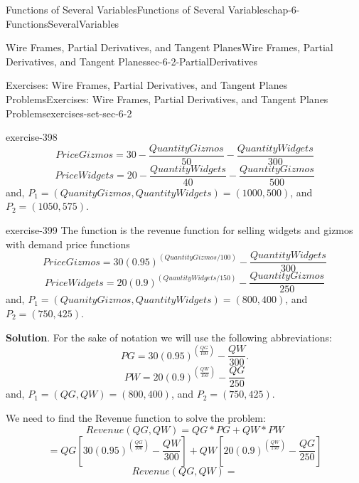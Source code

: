 \documentclass[oneside,10pt,]{book}
\numberwithin{equation}{section}
\begin{document}
\begin{chapterptx}{Functions of Several Variables}{}{Functions of Several Variables}{}{}{chap-6-FunctionsSeveralVariables}
\begin{sectionptx}{Wire Frames, Partial Derivatives, and Tangent Planes}{}{Wire Frames, Partial Derivatives, and Tangent Planes}{}{}{sec-6-2-PartialDerivatives}
\begin{exercises-subsection-numberless}{Exercises: Wire Frames, Partial Derivatives, and Tangent Planes Problems}{}{Exercises: Wire Frames, Partial Derivatives, and Tangent Planes Problems}{}{}{exercises-set-sec-6-2}
\begin{exercisegroup}
\begin{divisionexerciseeg}{4}{}{}{exercise-398}
%
\begin{equation*}
PriceGizmos=30-\frac{QuantityGizmos}{50}-\frac{QuantityWidgets}{300}
\end{equation*}
%
\begin{equation*}
PriceWidgets=20-\frac{QuantityWidgets}{40}-\frac{QuantityGizmos}{500}
\end{equation*}
\hypertarget{p-2264}{}%
and, \(P_1=(QuanityGizmos,QuantityWidgets)=(1000,500)\), and \(P_2=(1050,575)\).%
\end{divisionexerciseeg}%
\begin{divisionexerciseeg}{5}{}{}{exercise-399}%
\hypertarget{p-2265}{}%
The function is the revenue function for selling widgets and gizmos with demand price functions%
%
\begin{equation*}
PriceGizmos=30(0.95)^{(QuantityGizmos/100)}-\frac{QuantityWidgets}{300}
\end{equation*}
%
\begin{equation*}
PriceWidgets=20(0.9)^{(QuantityWidgets/150)}-\frac{QuantityGizmos}{250}
\end{equation*}
\hypertarget{p-2266}{}%
and, \(P_1=(QuanityGizmos,QuantityWidgets)=(800,400)\), and \(P_2=(750,425)\).%
\par\smallskip%
\noindent\textbf{Solution}.\hypertarget{solution-201}{}\quad%
\hypertarget{p-2267}{}%
For the sake of notation we will use the following abbreviations:%
%
\begin{equation*}
PG=30(0.95)^{\left(\frac{QG}{100}\right)}-\frac{QW}{300}.
\end{equation*}
%
\begin{equation*}
PW=20(0.9)^{\left(\frac{QW}{150}\right)} -\frac{QG}{250}
\end{equation*}
\hypertarget{p-2268}{}%
and, \(P_1=(QG,QW)=(800,400)\), and \(P_2=(750,425)\).%
\par
\hypertarget{p-2269}{}%
We need to find the Revenue function to solve the problem:%
%
\begin{equation*}
Revenue (QG,QW)=QG*PG+QW*PW
\end{equation*}
%
\begin{equation*}
=QG\left[30(0.95)^{\left(\frac{QG}{100}\right)}-\frac{QW}{300}\right]
+QW\left[20(0.9)^{\left(\frac{QW}{150}\right)}-\frac{QG}{250}\right]
\end{equation*}
%
\begin{equation*}
Revenue(QG,QW)=
\end{equation*}
%
\begin{equation*}

\end{equation*}
\end{divisionexerciseeg}
\end{exercisegroup}
\end{exercises-subsection-numberless}
\end{sectionptx}
\end{chapterptx}
\end{document}
